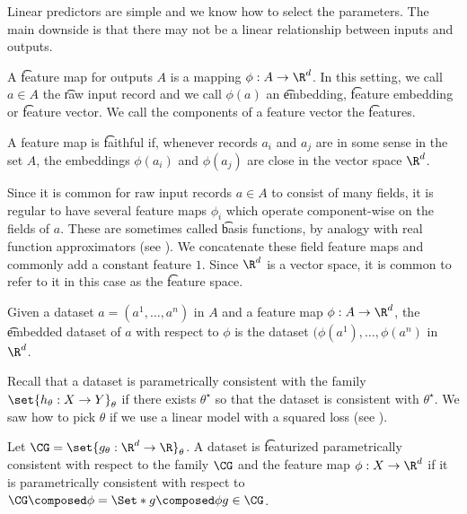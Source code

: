 

Linear predictors are simple and we know how to select the parameters.
The main downside is that there may not be a linear relationship between inputs and outputs.


A \t{feature map} for outputs $A$ is a mapping $\phi: A \to \R^d$.
In this setting, we call $a \in A$ the \t{raw input record} and we call $\phi(a)$ an \t{embedding}, \t{feature embedding} or \t{feature vector}.
We call the components of a feature vector the \t{features}.

A feature map is \t{faithful} if, whenever records $a_i$ and $a_j$ are in some sense  in the set $A$, the embeddings $\phi(a_i)$ and $\phi(a_j)$ are close in the vector space $\R^d$.

Since it is common for raw input records $a \in A$ to consist of many fields, it is regular to have several feature maps $\phi_i$ which operate component-wise on the fields of $a$.
These are sometimes called \t{basis functions}, by analogy with real function approximators (see ).
We concatenate these field feature maps and commonly add a constant feature $1$.
Since $\R^d$ is a vector space, it is common to refer to it in this case as the \t{feature space}.

Given a dataset $a = (a^1, \dots, a^n)$ in $A$ and a feature map $\phi: A \to \R^d$, the \t{embedded dataset} of $a$ with respect to $\phi$ is the dataset $(\phi(a^1), \dots, \phi(a^n)$ in $\R^d$.


Recall that a dataset is parametrically consistent with the family $\set{h_{\theta}: X \to Y}_{\theta}$ if there exists $\theta^\star$ so that the dataset is consistent with $\theta^{\star}$.
We saw how to pick $\theta$ if we use a linear model with a squared loss (see ).

Let $\CG = \set{g_{\theta}: \R^d \to \R}_{\theta}$.
A dataset is \t{featurized parametrically consistent} with respect to the family $\CG$ and the feature map $\phi: X \to \R^d$ if it is parametrically consistent with respect to $\CG \composed \phi = \Set*{g \composed \phi}{g \in \CG}$.

